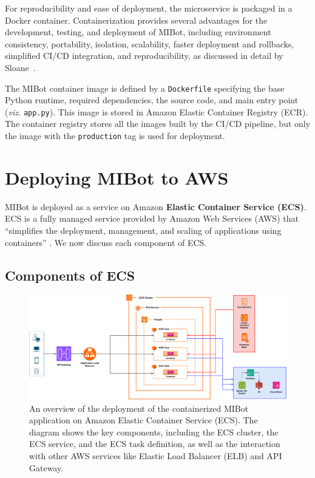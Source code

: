 For reproducibility and ease of deployment, the microservice is packaged in a Docker container. Containerization provides several advantages for the development, testing, and deployment of MIBot, including environment consistency, portability, isolation, scalability, faster deployment and rollbacks, simplified CI/CD integration, and reproducibility, as discussed in detail by Sloane~\citep{sloane2025containerization}.

The MIBot container image is defined by a \texttt{Dockerfile} specifying the base Python runtime, required dependencies, the source code, and main entry point (\emph{viz.} \texttt{app.py}). This image is stored in Amazon Elastic Container Registry (ECR). The container registry stores all the images built by the CI/CD pipeline, but only the image with the \texttt{production} tag is used for deployment.

\section{Deploying MIBot to AWS}
\label{sec:mibot-deployment}

MIBot is deployed as a service on Amazon \textbf{Elastic Container Service (ECS)}. ECS is a fully managed service provided by Amazon Web Services (AWS) that ``simplifies the deployment, management, and scaling of applications using containers'' \citep{aws-ecs-getting-started}. We now discuss each component of ECS.

\subsection{Components of ECS}
\begin{figure}[ht]
  \centering
  \includegraphics[width=0.99\linewidth]{fig/deployment.drawio.pdf} 
  \caption[MIBot Deployment on AWS ECS]{An overview of the deployment of the containerized MIBot application on Amazon Elastic Container Service (ECS). The diagram shows the key components, including the ECS cluster, the ECS service, and the ECS task definition, as well as the interaction with other AWS services like Elastic Load Balancer (ELB) and API Gateway.}
  \label{fig:ecs-components}
\end{figure}

